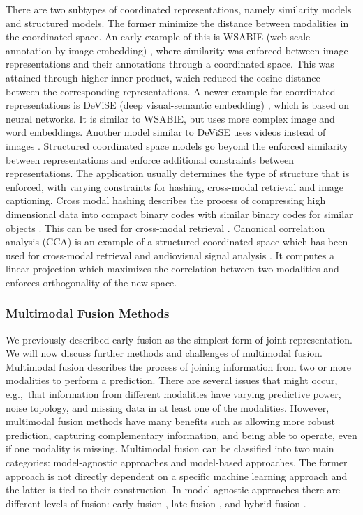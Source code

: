 \documentclass{article}
\begin{document}
There are two subtypes of coordinated representations, namely similarity models and structured models. The former minimize the distance between modalities in the coordinated space. An early example of this is WSABIE (web scale annotation by image embedding) \citep{weston2011wsabie}, where similarity was enforced between image representations and their annotations through a coordinated space. This was attained through higher inner product, which reduced the cosine distance between the corresponding representations. A newer example for coordinated representations is DeViSE (deep visual-semantic embedding) \citep{frome2013devise}, which is based on neural networks. It is similar to WSABIE, but uses more complex image and word embeddings. Another model similar to DeViSE uses videos instead of images \citep{pan2016joint}.
Structured coordinated space models go beyond the enforced similarity between representations and enforce additional constraints between representations. The application usually determines the type of structure that is enforced, with varying constraints for hashing, cross-modal retrieval and image captioning. Cross modal hashing describes the process of compressing high dimensional data into compact binary codes with similar binary codes for similar objects \citep{wang2014hashing}. This can be used for cross-modal retrieval \citep{bronstein2010data, jiang2015class}. Canonical correlation analysis (CCA) \citep{hotelling1936relations} is an example of a structured coordinated space which has been used for cross-modal retrieval \citep{hardoon2004canonical, klein2015associating, Rasiwasia2010ANA} and audiovisual signal analysis \citep{sargin2007audio, slaney2001facesync}. It computes a linear projection which maximizes the correlation between two modalities and enforces orthogonality of the new space.

\subsubsection{Multimodal Fusion Methods}

We previously described early fusion as the simplest form of joint representation. We will now discuss further methods and challenges of multimodal fusion. Multimodal fusion describes the process of joining information from two or more modalities to perform a prediction. There are several issues that might occur, e.g.,\ that information from different modalities have varying predictive power, noise topology, and missing data in at least one of the modalities. However, multimodal fusion methods have many benefits such as allowing more robust prediction, capturing complementary information, and being able to operate, even if one modality is missing. Multimodal fusion can be classified into two main categories: model-agnostic approaches and model-based approaches. The former approach is not directly dependent on a specific machine learning approach and the latter is tied to their construction. In model-agnostic approaches there are different levels of fusion: early fusion \citep{leong2011going, bruni2011distri}, late fusion \citep{gunes2005affect, snoek2005late}, and hybrid fusion \citep{atrey2010hybrid}.
\end{document}
